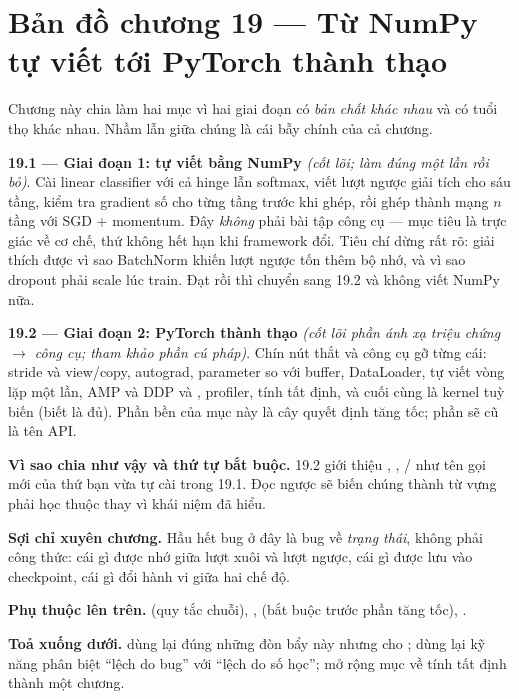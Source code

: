\documentclass[../../deep_learning.tex]{subfiles}
\begin{document}
\section*{Bản đồ chương 19 --- Từ NumPy tự viết tới PyTorch thành thạo}

Chương này chia làm hai mục vì hai giai đoạn có \emph{bản chất khác nhau} và có tuổi thọ khác nhau. Nhầm lẫn giữa chúng là cái bẫy chính của cả chương.

\textbf{19.1 --- Giai đoạn 1: tự viết bằng NumPy}  \emph{(cốt lõi; làm đúng một lần rồi bỏ)}. Cài linear classifier với cả hinge lẫn softmax, viết lượt ngược giải tích cho sáu tầng, kiểm tra gradient số cho từng tầng trước khi ghép, rồi ghép thành mạng $n$ tầng với SGD + momentum. Đây \emph{không} phải bài tập công cụ --- mục tiêu là trực giác về cơ chế, thứ không hết hạn khi framework đổi. Tiêu chí dừng rất rõ: giải thích được vì sao BatchNorm khiến lượt ngược tốn thêm bộ nhớ, và vì sao dropout phải scale lúc train. Đạt rồi thì chuyển sang 19.2 và không viết NumPy nữa.

\textbf{19.2 --- Giai đoạn 2: PyTorch thành thạo}  \emph{(cốt lõi phần ánh xạ triệu chứng \(\rightarrow\) công cụ; tham khảo phần cú pháp)}. Chín nút thắt và công cụ gỡ từng cái: stride và view/copy, autograd, parameter so với buffer, DataLoader, tự viết vòng lặp một lần, AMP và DDP và , profiler, tính tất định, và cuối cùng là kernel tuỳ biến (biết là đủ). Phần bền của mục này là cây quyết định tăng tốc; phần sẽ cũ là tên API.

\textbf{Vì sao chia như vậy và thứ tự bắt buộc.} 19.2 giới thiệu , , / như tên gọi mới của thứ bạn vừa tự cài trong 19.1. Đọc ngược sẽ biến chúng thành từ vựng phải học thuộc thay vì khái niệm đã hiểu.

\textbf{Sợi chỉ xuyên chương.} Hầu hết bug ở đây là bug về \emph{trạng thái}, không phải công thức: cái gì được nhớ giữa lượt xuôi và lượt ngược, cái gì được lưu vào checkpoint, cái gì đổi hành vi giữa hai chế độ.

\textbf{Phụ thuộc lên trên.}  (quy tắc chuỗi), ,  (bắt buộc trước phần tăng tốc), .

\textbf{Toả xuống dưới.}  dùng lại đúng những đòn bẩy này nhưng cho ;  dùng lại kỹ năng phân biệt ``lệch do bug'' với ``lệch do số học'';  mở rộng mục về tính tất định thành một chương.
\end{document}
